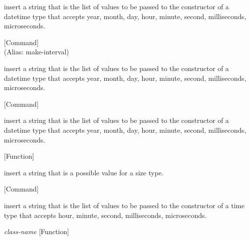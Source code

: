 \begin{doc-string}
insert a string that is the list of values to be passed to the constructor of
 a datetime type that accepts year, month, day, hour, minute, second,
 milliseconds, microseconds.
\end{doc-string}

\vspace{1em}
\noindent
{}
\usebox{\funcname}
 \hfill [Command]\\%
 (Alias: make-interval)

\begin{doc-string}
insert a string that is the list of values to be passed to the constructor of a datetime
 type that accepts year, month, day, hour, minute, second, milliseconds, microseconds.
\end{doc-string}

\vspace{1em}
\noindent
{}
\usebox{\funcname}
 \hfill [Command]

\begin{doc-string}
insert a string that is the list of values to be passed to the constructor of a datetime
 type that accepts year, month, day, hour, minute, second, milliseconds, microseconds.
\end{doc-string}

\vspace{1em}
\noindent
{}
\usebox{\funcname}
 \hfill [Function]

\begin{doc-string}
insert a string that is a possible value for a size type.
\end{doc-string}

\vspace{1em}
\noindent
{}
\usebox{\funcname}
 \hfill [Command]

\begin{doc-string}
insert a string that is the list of values to be passed to the constructor of
a time type that accepts hour, minute, second,  milliseconds, microseconds.
\end{doc-string}

\vspace{1em}
\noindent
{}
\usebox{\funcname}\emph{class-name}
 \hfill [Function]

